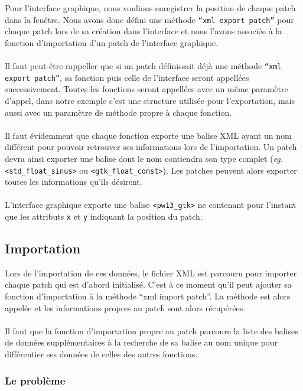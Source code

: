 Pour l'interface graphique, nous voulions enregistrer la position
de chaque patch dans la fen\^etre. Nous avons donc d\'efini une
m\'ethode {\tt ``xml export patch''} pour chaque patch lors de sa
cr\'eation dans l'interface et nous l'avons associ\'ee \`a
la fonction d'importation d'un patch de l'interface graphique.\\
\\
Il faut peut-\^etre rappeller que si un patch d\'efinissait d\'ej\`a
une m\'ethode {\tt ``xml export patch''}, sa fonction puis celle de
l'interface seront appell\'ees successivement. Toutes les fonctions
seront appell\'ees avec un m\^eme param\`etre d'appel, dans notre exemple
c'est une structure utilis\'ee pour l'exportation, mais aussi avec un
param\`etre de m\'ethode propre \`a chaque fonction.\\
\\
Il faut \'evidemment que chaque fonction exporte une balise XML ayant
un nom diff\'erent pour pouvoir retrouver ses informations lors de
l'importation. Un patch devra ainsi exporter une balise dont le nom
contiendra son type complet ({\em eg.} {\tt<std\_float\_sinus>} ou
{\tt<gtk\_float\_const>}). Les patches peuvent alors exporter toutes
les informations qu'ils d\'esirent.\\
\\
L'interface graphique
exporte une balise {\tt<pw13\_gtk>} ne contenant pour l'instant que
les attributs {\tt x} et {\tt y} indiquant la position du patch.


\subsection{Importation}

Lors de l'importation de ces donn\'ees, le fichier XML est parcouru
pour importer chaque patch qui est d'abord initialis\'e. C'est \`a ce
moment qu'il peut ajouter sa fonction d'importation \`a la m\'ethode
``xml import patch''. La m\'ethode est alors appel\'ee et les
informations propres au patch sont alors r\'ecup\'er\'ees.\\
\\
Il faut que la fonction d'importation propre au patch parcoure
la liste des balises de donn\'ees suppl\'ementaires \`a la recherche
de sa balise au nom unique pour diff\'erentier ses donn\'ees
de celles des autres fonctions.\\


\subsubsection{Le probl\`eme}

